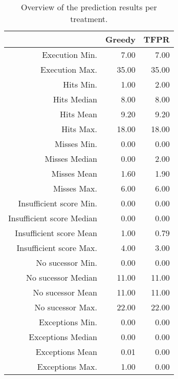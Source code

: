 \begin{table}[ht]
\centering
\begin{tabular}{rrr}
  \hline
 & Greedy & TFPR \\ 
  \hline
Execution Min. & 7.00 & 7.00 \\ 
  Execution Max. & 35.00 & 35.00 \\ 
  Hits Min. & 1.00 & 2.00 \\ 
  Hits Median & 8.00 & 8.00 \\ 
  Hits Mean & 9.20 & 9.20 \\ 
  Hits Max. & 18.00 & 18.00 \\ 
  Misses Min. & 0.00 & 0.00 \\ 
  Misses Median & 0.00 & 2.00 \\ 
  Misses Mean & 1.60 & 1.90 \\ 
  Misses Max. & 6.00 & 6.00 \\ 
  Insufficient score Min. & 0.00 & 0.00 \\ 
  Insufficient score Median & 0.00 & 0.00 \\ 
  Insufficient score Mean & 1.00 & 0.79 \\ 
  Insufficient score Max. & 4.00 & 3.00 \\ 
  No sucessor Min. & 0.00 & 0.00 \\ 
  No sucessor Median & 11.00 & 11.00 \\ 
  No sucessor Mean & 11.00 & 11.00 \\ 
  No sucessor Max. & 22.00 & 22.00 \\ 
  Exceptions Min. & 0.00 & 0.00 \\ 
  Exceptions Median & 0.00 & 0.00 \\ 
  Exceptions Mean & 0.01 & 0.00 \\ 
  Exceptions Max. & 1.00 & 0.00 \\ 
   \hline
\end{tabular}
\caption{Overview of the prediction results per treatment.} 
\label{tab:results:rq4:summary:treatment:counts}
\end{table}
